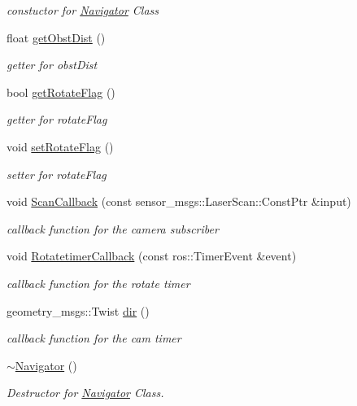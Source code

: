 \begin{DoxyCompactItemize}
\begin{DoxyCompactList}\small\item\em constuctor for \hyperlink{classNavigator}{Navigator} Class \end{DoxyCompactList}\item 
float \hyperlink{classNavigator_aecf7698fab9b42b91ee387524a0d9284}{get\+Obst\+Dist} ()
\begin{DoxyCompactList}\small\item\em getter for obst\+Dist \end{DoxyCompactList}\item 
bool \hyperlink{classNavigator_a4d838ef75089c6dc9e2530e5f39a389e}{get\+Rotate\+Flag} ()
\begin{DoxyCompactList}\small\item\em getter for rotate\+Flag \end{DoxyCompactList}\item 
void \hyperlink{classNavigator_afe356293bdf38da88a426f161d969ad8}{set\+Rotate\+Flag} ()
\begin{DoxyCompactList}\small\item\em setter for rotate\+Flag \end{DoxyCompactList}\item 
void \hyperlink{classNavigator_afd068836c4f8c13a2d072f0bf249dc88}{Scan\+Callback} (const sensor\+\_\+msgs\+::\+Laser\+Scan\+::\+Const\+Ptr \&input)
\begin{DoxyCompactList}\small\item\em callback function for the camera subscriber \end{DoxyCompactList}\item 
void \hyperlink{classNavigator_a16dbd75e0fcc830c871b424af0a72938}{Rotatetimer\+Callback} (const ros\+::\+Timer\+Event \&event)
\begin{DoxyCompactList}\small\item\em callback function for the rotate timer \end{DoxyCompactList}\item 
geometry\+\_\+msgs\+::\+Twist \hyperlink{classNavigator_ad3924883d7b8edd7728510b2d466baa3}{dir} ()
\begin{DoxyCompactList}\small\item\em callback function for the cam timer \end{DoxyCompactList}\item 
\hyperlink{classNavigator_a81bb9c10588736497700032d8b61e9d1}{$\sim$\+Navigator} ()\hypertarget{classNavigator_a81bb9c10588736497700032d8b61e9d1}{}\label{classNavigator_a81bb9c10588736497700032d8b61e9d1}

\begin{DoxyCompactList}\small\item\em Destructor for \hyperlink{classNavigator}{Navigator} Class. \end{DoxyCompactList}\end{DoxyCompactItemize}


